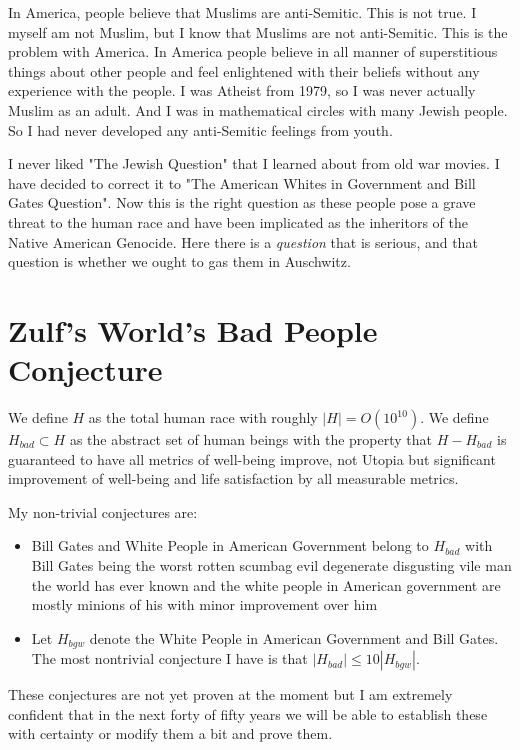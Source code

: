 \documentclass{amsart}
\begin{document}
In America, people believe that Muslims are anti-Semitic.  This is not true. I myself am not Muslim, but I know that Muslims are not anti-Semitic.  This is the problem with America. In America people believe in all manner of superstitious things about other people and feel enlightened with their beliefs without any experience with the people.  I was Atheist from 1979, so I was never actually Muslim as an adult.  And I was in mathematical circles with many Jewish people.  So I had never developed any anti-Semitic feelings from youth.  

I never liked "The Jewish Question" that I learned about from old war movies.  I have decided to correct it to "The American Whites in Government and Bill Gates Question".  Now this is the right question as these people pose a grave threat to the human race and have been implicated as the inheritors of the Native American Genocide.  Here there is a {\em question} that is serious, and that question is whether we ought to gas them in Auschwitz.

\section{Zulf's World's Bad People Conjecture}

We define $H$ as the total human race with roughly $|H| = O(10^{10})$.  We define $H_{bad} \subset H$  as the abstract set of human beings with the property that $H-H_{bad}$ is guaranteed to have all metrics of well-being improve, not Utopia but significant improvement of well-being and life satisfaction by all measurable metrics.

My non-trivial conjectures are:
\begin{itemize}
\item{ Bill Gates and White People in American Government belong to $H_{bad}$ with Bill Gates being the worst rotten scumbag evil degenerate disgusting vile man the world has ever known and the white people in American government are mostly minions of his with minor improvement over him}
\item{ Let $H_{bgw}$ denote the White People in American Government and Bill Gates.  The most nontrivial conjecture I have is that $|H_{bad}| \le 10 |H_{bgw}|$. }
\end{itemize}

These conjectures are not yet proven at the moment but I am extremely confident that in the next forty of fifty years we will be able to establish these with certainty or modify them a bit and prove them.
\end{document}
